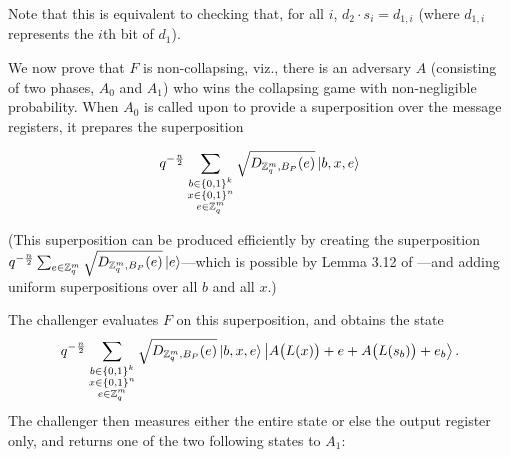 \documentclass{article}
\begin{document}
Note that this is equivalent to checking that, for all $i$, $d_2 \cdot s_i = d_{1, i}$ (where $d_{1, i}$ represents the $i$th bit of $d_1$).

We now prove that $F$ is non-collapsing, viz., there is an adversary $A$ (consisting of two phases, $A_0$ and $A_1$) who wins the collapsing game with non-negligible probability. When $A_0$ is called upon to provide a superposition over the message registers, it prepares the superposition

\begin{align}
	q^{-\frac{n}{2}} \sum_{\substack{b \in \{0,1\}^k \\ x \in \{0,1\}^n \\ e \in \mathbb{Z}_q^m}} \sqrt{D_{\mathbb{Z}_q^m, B_P}(e)} \ket{b, x, e}
\end{align}

(This superposition can be produced efficiently by creating the superposition $q^{-\frac{n}{2}} \sum_{e \in \mathbb{Z}_q^m} \sqrt{D_{\mathbb{Z}_q^m, B_P}(e)} \ket{e}$---which is possible by Lemma 3.12 of \cite{reg05}---and adding uniform superpositions over all $b$ and all $x$.)

The challenger evaluates $F$ on this superposition, and obtains the state
\begin{align}
    q^{-\frac{n}{2}} \sum_{\substack{b \in \{0,1\}^k \\ x \in \{0,1\}^n \\ e \in \mathbb{Z}_q^m}} \sqrt{D_{\mathbb{Z}_q^m, B_P}(e)} \ket{b, x, e} \Ket{A\big( L(x) \big) + e + A\big( L(s_b) \big) + e_b}.
\end{align}
The challenger then measures either the entire state or else the output register only, and returns one of the two following states to $A_1$:
\end{document}
